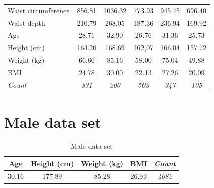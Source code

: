 \documentclass[12pt,a4paper,openany,UKenglish]{scrreprt}
\begin{document}
\begin{table}[H]
\begin{tabular}{lccccc}
		Waist circumference          & 856.81                               & 1036.32      & 773.93       & 945.45       & 696.40       \\
		Waist depth                  & 210.79                               & 268.05       & 187.36       & 236.94       & 169.92       \\
		\hline
		Age                          & 28.71                                & 32.90        & 26.76        & 31.36        & 25.73        \\
		Height (cm)                  & 164.20                               & 168.69       & 162,07       & 166,04       & 157.72       \\
		Weight (kg)                  & 66.66                                & 85.16        & 58.00        & 75.04        & 49.88        \\
		BMI                          & 24.78                                & 30.00        & 22.13        & 27.26        & 20.09        \\
		\hline
		\textit{Count}               & \textit{831}                         & \textit{200} & \textit{503} & \textit{347} & \textit{105}
	\end{tabular}
\end{table}

\section{Male data set}
\vspace{-8mm}
\begin{table}[H]
	\caption{Male data set}
	\centering
	\begin{tabular}{|cccc|c|}
		\hline
		Age   & Height (cm) & Weight (kg) & BMI   & \textit{Count} \\
		\hline
		30.16 & 177.89      & 85.28       & 26.93 & \textit{4082}  \\
		\hline
	\end{tabular}
\end{table}
\end{document}
